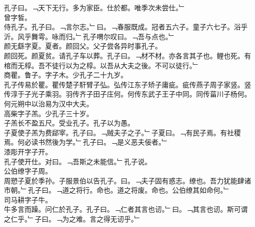 \documentclass{zhvt-classic}
\begin{document}
\hspace*{2em}孔子曰。﹁天下无行。多为家臣。仕於都。唯季次未尝仕。﹂\\
\hspace*{2em}曾字皙。\\
\hspace*{2em}侍孔子。孔子曰。﹁言尔志。﹂曰。﹁春服既成。冠者五六子。童子六七子。浴乎沂。风乎舞雩。咏而归。﹂孔子喟尔叹曰。﹁吾与点也。﹂\\
\hspace*{2em}颜无繇字夏。夏者。颜回父。父子尝各异时事孔子。\\
\hspace*{2em}颜回死。颜夏贫。请孔子车以葬。孔子曰。﹁材不材。亦各言其子也。鲤也死。有棺而无椁。吾不徒行以为之椁。以吾从大夫之後。不可以徒行。﹂\\
\hspace*{2em}商瞿。鲁子。字子木。少孔子二十九岁。\\
\hspace*{2em}孔子传易於瞿。瞿传楚子馯臂子弘。弘传江东子矫子庸疵。疵传燕子周子家竖。竖传淳于子光子乘羽。羽传齐子田子庄何。何传东武子王子中同。同传菑川子杨何。何元朔中以治易为汉中大夫。\\
\hspace*{2em}高柴字子羔。少孔子三十岁。\\
\hspace*{2em}子羔长不盈五尺。受业孔子。孔子以为愚。\\
\hspace*{2em}子夏使子羔为费郈宰。孔子曰。﹁贼夫子之子。﹂子夏曰。﹁有民子焉。有社稷焉。何必读书然後为学。﹂孔子曰。﹁是义恶夫佞者。﹂\\
\hspace*{2em}漆彫开字子开。\\
\hspace*{2em}孔子使开仕。对曰。﹁吾斯之未能信。﹂孔子说。\\
\hspace*{2em}公伯缭字子周。\\
\hspace*{2em}周愬子夏於季孙。子服景伯以告孔子。曰。﹁夫子固有惑志。缭也。吾力犹能肆诸市朝。﹂孔子曰。﹁道之将行。命也。道之将废。命也。公伯缭其如命何。﹂\\
\hspace*{2em}司马耕字子牛。\\
\hspace*{2em}牛多言而躁。问仁於孔子。孔子曰。﹁仁者其言也讱。﹂曰。﹁其言也讱。斯可谓之仁乎。﹂子曰。﹁为之难。言之得无讱乎。﹂\\
\end{document}
